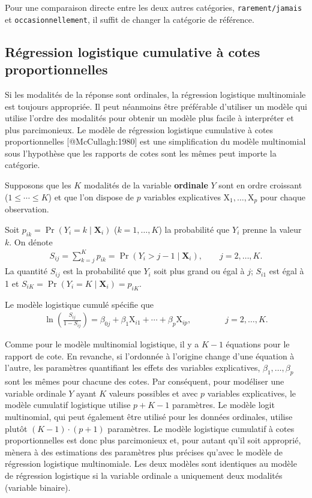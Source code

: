 \documentclass[
  11pt,
  letterpaper,
]{scrbook}
\theoremstyle{definition}
\theoremstyle{remark}
\begin{document}
Pour une comparaison directe entre les deux autres catégories,
\texttt{rarement/jamais} et \texttt{occasionnellement}, il suffit de
changer la catégorie de référence.

\hypertarget{ruxe9gression-logistique-cumulative-uxe0-cotes-proportionnelles}{%
\subsection{Régression logistique cumulative à cotes
proportionnelles}\label{ruxe9gression-logistique-cumulative-uxe0-cotes-proportionnelles}}

Si les modalités de la réponse sont ordinales, la régression logistique
multinomiale est toujours appropriée. Il peut néanmoins être préférable
d'utiliser un modèle qui utilise l'ordre des modalités pour obtenir un
modèle plus facile à interpréter et plus parcimonieux. Le modèle de
régression logistique cumulative à cotes proportionnelles
{[}@McCullagh:1980{]} est une simplification du modèle multinomial sous
l'hypothèse que les rapports de cotes sont les mêmes peut importe la
catégorie.

Supposons que les \(K\) modalités de la variable \textbf{ordinale} \(Y\)
sont en ordre croissant (\(1 \leq \cdots \leq K\)) et que l'on dispose
de \(p\) variables explicatives \(\mathrm{X}_1, \ldots, \mathrm{X}_p\)
pour chaque observation.

Soit \(p_{ik}=\Pr(Y_i=k \mid \mathbf{X}_{i})\) (\(k=1, \ldots, K\)) la
probabilité que \(Y_{i}\) prenne la valeur \(k\). On dénote
\begin{align*}
S_{ij}=\sum_{k=j}^K p_{ik}= \Pr(Y_{i} > j - 1 \mid \mathbf{X}_{i}), \qquad j=2, \ldots, K.
\end{align*} La quantité \(S_{ij}\) est la probabilité que \(Y_i\) soit
plus grand ou égal à \(j\); \(S_{i1}\) est égal à 1 et
\(S_{iK} = \Pr(Y_i=K \mid \mathbf{X}_{i})=p_{iK}\).

Le modèle logistique cumulé spécifie que \begin{align*}
\ln \left( \frac{S_{ij}}{1-S_{ij}}\right) = \beta_{0j} + \beta_1 \mathrm{X}_{i1} + \cdots + \beta_p \mathrm{X}_{ip}, \qquad \qquad  j=2, \ldots, K.
\end{align*}

Comme pour le modèle multinomial logistique, il y a \(K-1\) équations
pour le rapport de cote. En revanche, si l'ordonnée à l'origine change
d'une équation à l'autre, les paramètres quantifiant les effets des
variables explicatives, \(\beta_1, \ldots, \beta_p\) sont les mêmes pour
chacune des cotes. Par conséquent, pour modéliser une variable ordinale
\(Y\) ayant \(K\) valeurs possibles et avec \(p\) variables
explicatives, le modèle cumulatif logistique utilise \(p + K - 1\)
paramètres. Le modèle logit multinomial, qui peut également être utilisé
pour les données ordinales, utilise plutôt \((K-1) \cdot(p+1)\)
paramètres. Le modèle logistique cumulatif à cotes proportionnelles est
donc plus parcimonieux et, pour autant qu'il soit approprié, mènera à
des estimations des paramètres plus précises qu'avec le modèle de
régression logistique multinomiale. Les deux modèles sont identiques au
modèle de régression logistique si la variable ordinale a uniquement
deux modalités (variable binaire).
\end{document}
